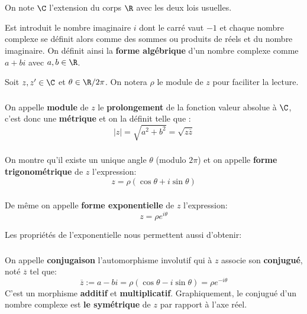 \chapter*{}
On note \(\C\) l'extension du corps \(\R\) avec les deux lois usuelles. \< 

Est introduit le nombre imaginaire \(i\) dont le carré vaut \(-1\) et chaque nombre complexe se définit alors comme des sommes ou produits de réels et du nombre imaginaire.\+
On définit ainsi la \textbf{forme algébrique} d'un nombre complexe comme \(a + bi\) avec \(a, b \in \R\). \<

Soit \(z, z' \in \C\) et \(\theta \in \R/2\pi\). On notera \(\rho\) le module de \(z\) pour faciliter la lecture.

\subsection*{}
On appelle \textbf{module} de \(z\) le \textbf{prolongement} de la fonction valeur absolue à \(\C\), c'est donc une \textbf{métrique} et on la définit telle que {:}
\[
    |z| = \sqrt{a^2 + b^2} = \sqrt{z\overline{z}} 
\]

\subsection*{}
On montre qu'il existe un unique angle \(\theta\) (modulo \(2\pi\)) et on appelle \textbf{forme trigonométrique} de \(z\) l'expression:
\[
    z = \rho(\cos\theta+i\sin\theta)   
\]

\subsection*{}
De même on appelle \textbf{forme exponentielle} de \(z\) l'expression:
\[
    z = \rho e^{i\theta} 
\]

Les propriétés de l'exponentielle nous permettent aussi d'obtenir:
\subsection*{}
On appelle \textbf{conjugaison} l'automorphisme involutif qui à \(z\) associe son \textbf{conjugué}, noté \(\overline{z}\) tel que:
\[
    \overline{z} := a - bi = \rho(\cos\theta - i\sin\theta) = \rho e^{-i\theta}
\]
C'est un morphisme \textbf{additif} et \textbf{multiplicatif}. Graphiquement, le conjugué d'un nombre complexe est \textbf{le symétrique} de \(z\) par rapport à l'axe réel.\<

